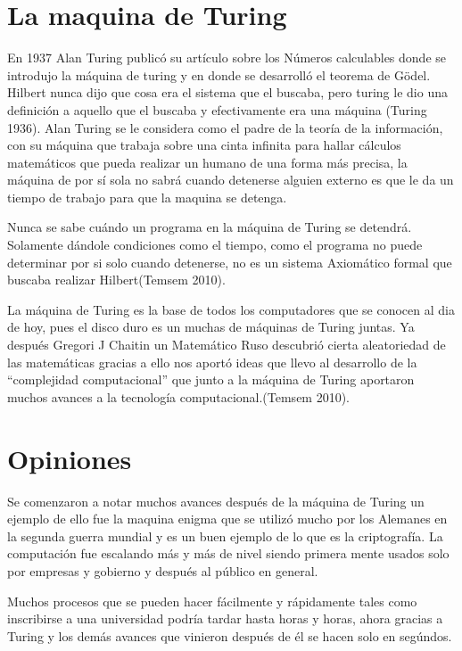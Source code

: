 \documentclass{article}
\begin{document}
\section{La maquina de Turing}
En 1937 Alan Turing publicó su artículo sobre los Números calculables donde se introdujo la máquina de turing y en donde se desarrolló el teorema de Gödel. Hilbert nunca dijo que cosa era el sistema que el buscaba, pero turing le dio una definición a aquello que el buscaba y efectivamente era una máquina (Turing 1936).
Alan Turing se le considera como el padre de la teoría de la información, con su máquina que trabaja sobre una cinta infinita para hallar cálculos matemáticos que pueda realizar un humano de una forma más precisa, la máquina de por sí sola no sabrá cuando detenerse alguien externo es que le da un tiempo de trabajo para que la maquina se detenga.

\vspace{10pt}

Nunca se sabe cuándo un programa en la máquina de Turing se detendrá. Solamente dándole condiciones como el tiempo, como el programa no puede determinar por si solo cuando detenerse, no es un sistema Axiomático formal que buscaba realizar Hilbert(Temsem 2010).

\vspace{10pt}
La máquina de Turing es la base de todos los computadores que se conocen al dia de hoy, pues el disco duro es un muchas de máquinas de Turing juntas.
Ya después Gregori J Chaitin un Matemático Ruso descubrió cierta aleatoriedad de las matemáticas gracias a ello nos aportó ideas que llevo al desarrollo de la “complejidad computacional” que junto a la máquina de Turing aportaron muchos avances a la tecnología computacional.(Temsem 2010).
\section{Opiniones}
Se comenzaron a notar muchos avances después de la máquina de Turing un ejemplo de ello fue la maquina enigma que se utilizó mucho por los Alemanes en la segunda guerra mundial y es un buen ejemplo de lo que es la criptografía. La computación fue escalando más y más de nivel siendo primera mente usados solo por empresas y gobierno y después al público en general.
\vspace{10pt}

Muchos procesos que se pueden hacer fácilmente y rápidamente tales como inscribirse a una universidad podría tardar hasta horas y horas, ahora gracias a Turing y los demás avances que vinieron después de él se hacen solo en segúndos.
\end{document}

